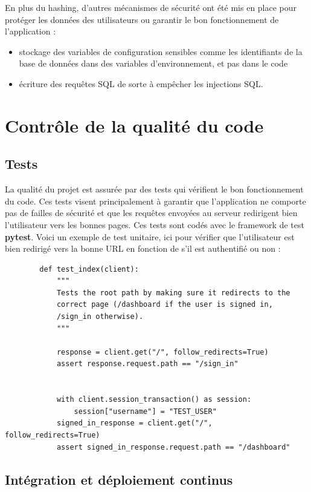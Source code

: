 \documentclass[french]{article}
\begin{document}
    En plus du hashing, d'autres mécanismes de sécurité ont été mis en place pour protéger les données des utilisateurs ou garantir le bon fonctionnement de l'application :
    \begin{itemize}
        \item stockage des variables de configuration sensibles comme les identifiants de la base de données dans des variables d'environnement, et pas dans le code
        \item écriture des requêtes SQL de sorte à empêcher les injections SQL.
    \end{itemize}
    \section{Contrôle de la qualité du code}
    
    \subsection{Tests}
    La qualité du projet est assurée par des tests qui vérifient le bon fonctionnement du code. Ces tests visent principalement à garantir que l'application ne comporte pas de failles de sécurité et que les requêtes envoyées au serveur redirigent bien l'utilisateur vers les bonnes pages. Ces tests sont codés avec le framework de test \textbf{pytest}. Voici un exemple de test unitaire, ici pour vérifier que l'utilisateur est bien redirigé vers la bonne URL en fonction de s'il est authentifié ou non :
    \begin{verbatim}
        def test_index(client):
            """
            Tests the root path by making sure it redirects to the 
            correct page (/dashboard if the user is signed in,
            /sign_in otherwise).
            """

            response = client.get("/", follow_redirects=True)
            assert response.request.path == "/sign_in"


            with client.session_transaction() as session:
                session["username"] = "TEST_USER"
            signed_in_response = client.get("/", follow_redirects=True)
            assert signed_in_response.request.path == "/dashboard"
    \end{verbatim}

    \subsection{Intégration et déploiement continus}
\end{document}
